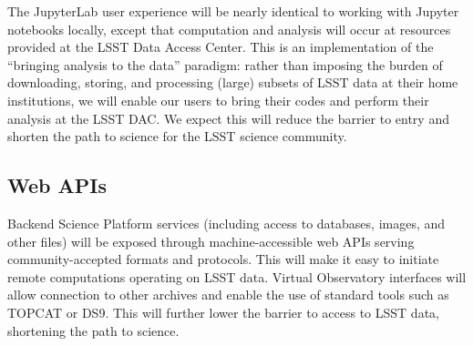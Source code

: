 \documentclass[DM,lsstdraft,toc]{lsstdoc}
\begin{document}
The JupyterLab user experience will be nearly identical to working with
Jupyter notebooks locally, except that computation and analysis will occur
at resources provided at the LSST Data Access Center.  This is an
implementation of the “bringing analysis to the data” paradigm: rather
than imposing the burden of downloading, storing, and processing (large)
subsets of LSST data at their home institutions, we will enable our users to
bring their codes and perform their analysis at the LSST DAC.  We expect
this will reduce the barrier to entry and shorten the path to science for
the LSST science community.

\subsection{Web APIs}

Backend Science Platform services (including access to
databases, images, and other files) will be exposed through
machine-accessible web APIs serving community-accepted formats and
protocols.  This will make it easy to initiate remote computations operating
on LSST data.  Virtual Observatory interfaces will allow connection to other
archives and enable the use of standard tools such as TOPCAT or DS9. 
This will further lower the barrier to access to LSST data, shortening the
path to science.
\end{document}

